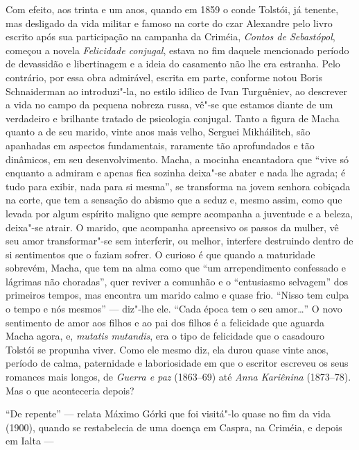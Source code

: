 {{Com efeito, aos trinta e um anos, quando em 1859 o conde Tolstói,
já tenente, mas desligado da vida militar e famoso na corte do czar
Alexandre  pelo livro escrito após sua participação na campanha da
Criméia, \emph{Contos de Sebastópol}, começou a novela \emph{Felicidade
conjugal}, estava no fim daquele mencionado período de devassidão e
libertinagem e a ideia do casamento não lhe era estranha. Pelo
contrário, por essa obra admirável, escrita em parte, conforme notou
Boris Schnaiderman ao introduzi"-la, no estilo idílico de Ivan Turguêniev,
ao descrever a vida no campo da pequena nobreza russa, vê"-se que estamos
diante de um verdadeiro e brilhante tratado de psicologia conjugal.
Tanto a figura de Macha quanto a de seu marido, vinte anos mais velho,
Serguei Mikháilitch, são apanhadas em aspectos fundamentais,
raramente tão aprofundados e tão dinâmicos, em seu desenvolvimento.
Macha, a mocinha encantadora que ``vive só enquanto a admiram e apenas
fica sozinha deixa"-se abater e nada lhe agrada; é tudo para exibir, nada
para si mesma'', se transforma na jovem senhora cobiçada na corte, que
tem a sensação do abismo que a seduz e, mesmo assim, como que levada
por algum espírito maligno que sempre acompanha a juventude e a beleza,
deixa"-se atrair. O marido, que acompanha apreensivo os passos da mulher,
vê seu amor transformar"-se sem interferir, ou melhor, interfere
destruindo dentro de si sentimentos que o faziam sofrer. O curioso é que
quando a maturidade sobrevém, Macha, que tem na alma como que ``um
arrependimento confessado e lágrimas não choradas'', quer reviver a
comunhão e o ``entusiasmo selvagem'' dos primeiros
tempos, mas encontra um marido calmo e quase frio. ``Nisso tem culpa o
tempo e nós mesmos'' --- diz"-lhe ele. ``Cada época tem o seu amor\ldots{}'' O
novo sentimento de amor aos filhos e ao pai dos filhos é a
felicidade que aguarda Macha agora, e, \emph{mutatis mutandis}, era o
tipo de felicidade que o casadouro Tolstói se propunha viver. Como ele
mesmo diz, ela durou quase vinte anos, período de calma, paternidade e
laboriosidade em que o escritor escreveu os seus romances mais longos,
de \emph{Guerra e paz} (1863--69) até \emph{Anna Kariênina} (1873--78).
Mas o que aconteceria depois?

``De repente'' --- relata Máximo Górki que foi visitá"-lo quase no fim
da vida (1900), quando se restabelecia de uma doença em Caspra,
na Criméia, e depois em Ialta ---

}}
